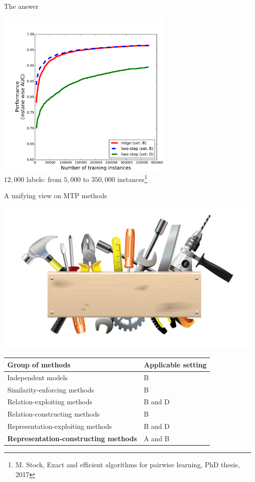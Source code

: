 \documentclass[]{beamer}
\renewcommand{\alert}[1]{\textbf{\color{putblue} #1}}
\begin{document}
\begin{frame}{The answer}  
 \center

\vspace{-0.5cm}
   \includegraphics[width=0.65\textwidth]{Figures/lc_wiki} \\
   $12,000$ labels: from $5,000$ to $350,000$ instances\footnote{M. Stock, Exact and efficient algorithms for pairwise learning, PhD thesis, 2017}
	\vspace{0.2cm}
\end{frame}


\begin{frame}{A unifying view on MTP methods}

\begin{center}
\includegraphics[scale=0.3]{pics/tools}

\begin{tabular}{ll}
\hline
Group of methods & Applicable setting \\
\hline
\hline
Independent models & B \\
Similarity-enforcing methods & B   \\ 
Relation-exploiting methods & B and D  \\
Relation-constructing methods & B \\
Representation-exploiting methods & B and D \\
\alert{Representation-constructing methods} & A and B \\
\hline  
\end{tabular}
\end{center}
\end{frame}
\end{document}
